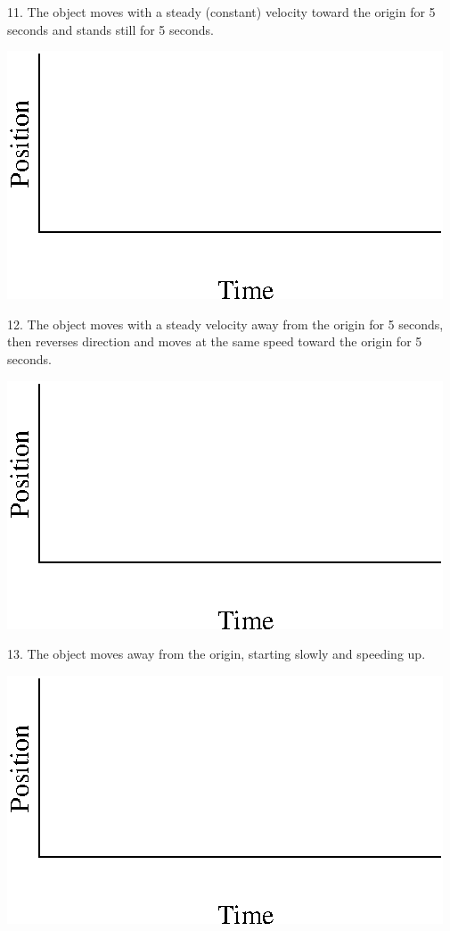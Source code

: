 11. The object moves with a steady (constant) velocity toward the origin for
5 seconds and stands still for 5 seconds.

\vspace{0.3cm}
{\par\centering \includegraphics{position_fig13.eps} \par}
\vspace{0.3cm}

12. The object moves with a steady velocity away from the origin for 5 seconds,
then reverses direction and moves at the same speed toward the origin for 5
seconds.

\vspace{0.3cm}
{\par\centering \includegraphics{position_fig13.eps} \par}
\vspace{0.3cm}

13. The object moves away from the origin, starting slowly and speeding up.

\vspace{0.3cm}
{\par\centering \includegraphics{position_fig13.eps} \par}
\vspace{0.3cm}

